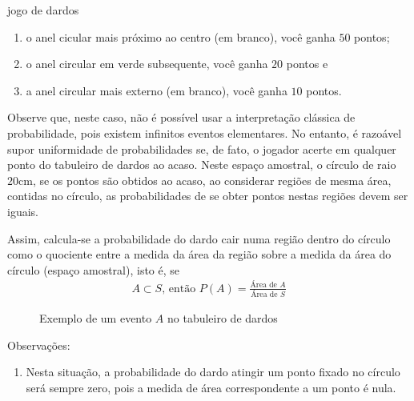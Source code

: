 \begin{task}{jogo de dardos}
\begin{enumerate}
\item {} 
o anel cicular mais próximo ao centro (em branco), você ganha $50$ pontos;

\item {} 
o anel circular em verde subsequente, você ganha $20$ pontos e

\item {} 
a anel circular mais externo (em branco), você ganha $10$ pontos.

\end{enumerate}


Observe que, neste caso, não é possível usar a interpretação clássica de probabilidade, pois existem infinitos eventos elementares. No entanto, é razoável supor uniformidade de probabilidades se, de fato, o jogador acerte em qualquer ponto do tabuleiro de dardos ao acaso. Neste espaço amostral, o círculo de raio $20$cm, se os pontos são obtidos ao acaso, ao considerar regiões de mesma área, contidas no círculo, as probabilidades de se obter pontos nestas regiões devem ser iguais.

Assim, calcula-se a probabilidade do dardo cair numa região dentro do círculo como o quociente entre a medida da área da região sobre a medida da área do círculo (espaço amostral), isto é, se
\begin{equation*}
\begin{split}A\subset S \text{, então } P(A)=\displaystyle{\frac{\text{Área de }A}{\text{Área de }S}}\end{split}
\end{equation*}

\begin{figure}[H]
\centering



\caption{Exemplo de um evento \(A\) no tabuleiro de dardos}
\end{figure}

Observações:
\begin{enumerate}
\item {} 
Nesta situação, a probabilidade do dardo atingir um ponto fixado no círculo será sempre zero, pois a medida de área correspondente a um ponto é nula.


\end{enumerate}
\end{task}
